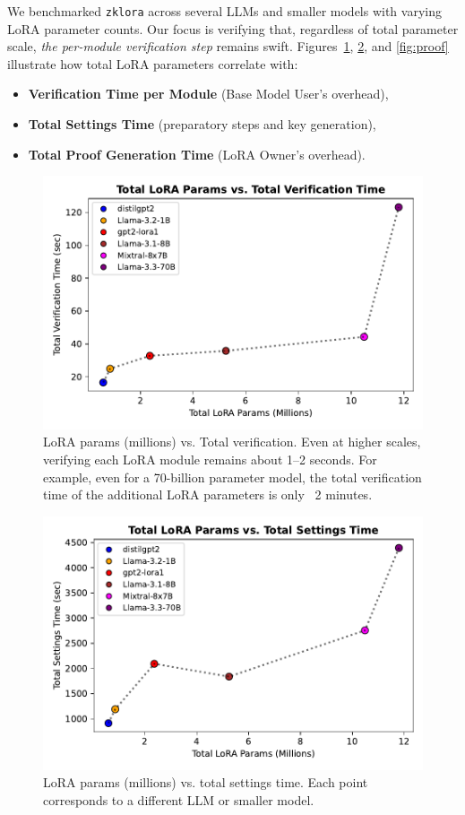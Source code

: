 \documentclass[11pt]{article}
\begin{document}
We benchmarked \texttt{zklora} across several LLMs and smaller models with varying LoRA parameter counts. Our focus is verifying that, regardless of total parameter scale, \emph{the per-module verification step} remains swift. 
Figures~\ref{fig:verify}, \ref{fig:settings}, and \ref{fig:proof} illustrate how total LoRA parameters correlate with:
\begin{itemize}
    \item \textbf{Verification Time per Module} (Base Model User’s overhead),
    \item \textbf{Total Settings Time} (preparatory steps and key generation),
    \item \textbf{Total Proof Generation Time} (LoRA Owner’s overhead).
\end{itemize}

\begin{figure}[ht]
    \centering
    \includegraphics[width=0.58\linewidth]{figs/fig_verify.pdf}
    \caption{LoRA params (millions) vs. Total verification. Even at higher scales, verifying each LoRA module remains about 1--2 seconds. For example, even for a 70-billion parameter model, the total verification time of the additional LoRA parameters is only ~2 minutes.}
    \label{fig:verify}
\end{figure}

\begin{figure}[ht]
    \centering
    \includegraphics[width=0.58\linewidth]{figs/fig_settings.pdf}
    \caption{LoRA params (millions) vs. total settings time. Each point corresponds to a different LLM or smaller model.}
    \label{fig:settings}
\end{figure}
\end{document}
